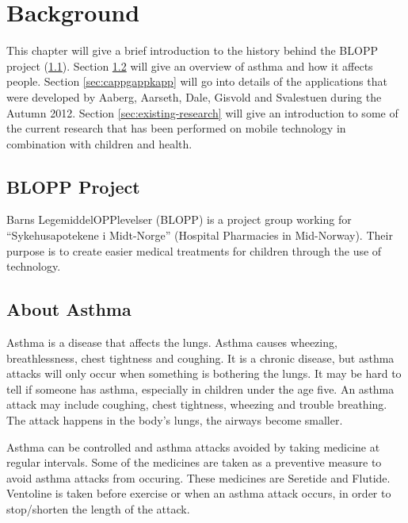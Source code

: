 \chapter{Background}
\label{chp:background}


This chapter will give a brief introduction to the history behind the BLOPP project (\ref{sec:bloppproject}). Section \ref{sec:about-asthma} will give an overview of asthma and how it affects people. Section \ref{sec:cappgappkapp} will go into details of the applications that were developed by Aaberg, Aarseth, Dale, Gisvold and Svalestuen during the Autumn 2012.     
Section \ref{sec:existing-research} will give an introduction to some of the current research that has been performed on mobile technology in combination with children and health.   


\section{BLOPP Project}
\label{sec:bloppproject}
Barns LegemiddelOPPlevelser (BLOPP) is a project group working for ``Sykehusapotekene i Midt-Norge'' (Hospital Pharmacies in Mid-Norway). Their purpose is to create easier medical treatments for children through the use of technology. 

\section{About Asthma}
\label{sec:about-asthma}
Asthma is a disease that affects the lungs. Asthma causes wheezing, breathlessness, chest tightness and coughing. It is a chronic disease, but asthma attacks will only occur when something is bothering the lungs. It may be hard to tell if someone has asthma, especially in children under the age five. 
An asthma attack may include coughing, chest tightness, wheezing and trouble breathing. The attack happens in the body's lungs, the airways become smaller.

Asthma can be controlled and asthma attacks avoided by taking medicine at regular intervals. Some of the medicines are taken as a preventive measure to avoid asthma attacks from occuring. These medicines are Seretide and Flutide. Ventoline is taken before exercise or when an asthma attack occurs, in order to stop/shorten the length of the attack. 

